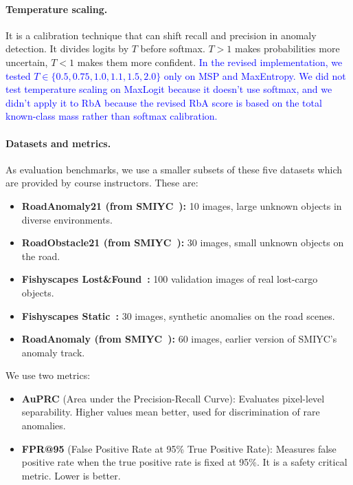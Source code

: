 \paragraph{Temperature scaling.}

It is a calibration technique that can shift recall and precision in anomaly detection.
It divides logits by $T$ before softmax. $T > 1$ makes probabilities more uncertain, $T < 1$ makes them more confident. 
\textcolor{blue}{In the revised implementation, we tested $T \in \{0.5, 0.75, 1.0, 1.1, 1.5, 2.0\}$ only on MSP and MaxEntropy. We did not test temperature scaling on MaxLogit because it doesn't use softmax, and we didn't apply it to RbA because the revised RbA score is based on the total known-class mass rather than softmax calibration.}

\paragraph{Datasets and metrics.}

As evaluation benchmarks, we use a smaller subsets of these five datasets which are provided by course instructors. These are:

\begin{itemize}
    
    \item \textbf{RoadAnomaly21 (from SMIYC~\cite{smiyc}):} 10 images, large unknown objects in diverse environments.
    \item \textbf{RoadObstacle21 (from SMIYC~\cite{smiyc}):} 30 images, small unknown objects on the road.
    \item \textbf{Fishyscapes Lost\&Found~\cite{fishyscapes}:} 100 validation images of real lost-cargo objects.
    \item \textbf{Fishyscapes Static~\cite{fishyscapes}:} 30 images, synthetic anomalies on the road scenes.
    \item \textbf{RoadAnomaly (from SMIYC~\cite{smiyc}):} 60 images, earlier version of SMIYC's anomaly track.     

\end{itemize}
We use two metrics:
\begin{itemize}
    \item \textbf{AuPRC} (Area under the Precision-Recall Curve): Evaluates pixel-level separability. Higher values mean better, used for discrimination of rare anomalies.
    \item \textbf{FPR@95} (False Positive Rate at 95\% True Positive Rate): Measures false positive rate when the true positive rate is fixed at 95\%. It is a safety critical metric. Lower is better.
\end{itemize}
